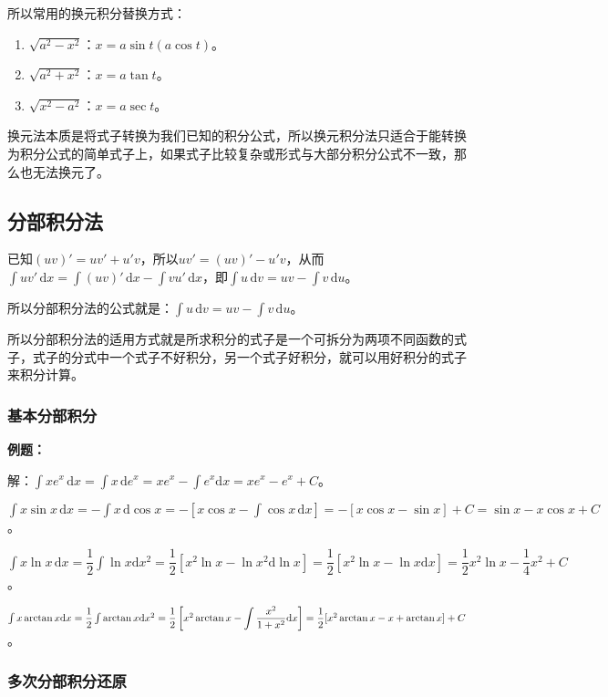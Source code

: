 \documentclass[UTF8, 12pt]{ctexart}
\begin{document}
所以常用的换元积分替换方式：

\begin{enumerate}
    \item $\sqrt{a^2-x^2}$：$x=a\sin t(a\cos t)$。
    \item $\sqrt{a^2+x^2}$：$x=a\tan t$。
    \item $\sqrt{x^2-a^2}$：$x=a\sec t$。
\end{enumerate}

换元法本质是将式子转换为我们已知的积分公式，所以换元积分法只适合于能转换为积分公式的简单式子上，如果式子比较复杂或形式与大部分积分公式不一致，那么也无法换元了。

\subsection{分部积分法}

已知$(uv)'=uv'+u'v$，所以$uv'=(uv)'-u'v$，从而$\int uv'\,\textrm{d}x=\int(uv)'\,\textrm{d}x-\int vu'\,\textrm{d}x$，即$\int u\,\textrm{d}v=uv-\int v\,\textrm{d}u$。

所以分部积分法的公式就是：$\int u\,\textrm{d}v=uv-\int v\,\textrm{d}u$。

所以分部积分法的适用方式就是所求积分的式子是一个可拆分为两项不同函数的式子，式子的分式中一个式子不好积分，另一个式子好积分，就可以用好积分的式子来积分计算。

\subsubsection{基本分部积分}

\textbf{例题：}

解：$\int xe^x\,\textrm{d}x=\int x\,\textrm{d}e^x=xe^x-\int e^x\textrm{d}x=xe^x-e^x+C$。

$\int x\sin x\,\textrm{d}x=-\int x\,\textrm{d}\cos x=-[x\cos x-\int\cos x\,\textrm{d}x]=-[x\cos x-\sin x]+C=\sin x-x\cos x+C$。

$\int x\ln x\,\textrm{d}x=\dfrac{1}{2}\int\ln x\textrm{d}x^2=\dfrac{1}{2}[x^2\ln x-\ln x^2\textrm{d}\ln x]=\dfrac{1}{2}[x^2\ln x-\ln x\textrm{d}x]=\dfrac{1}{2}x^2\ln x-\dfrac{1}{4}x^2+C$。

$\int x\arctan x\textrm{d}x=\dfrac{1}{2}\int\arctan x\textrm{d}x^2=\dfrac{1}{2}\left[x^2\arctan x-\displaystyle{\int\dfrac{x^2}{1+x^2}\textrm{d}x}\right]=\\ \dfrac{1}{2}[x^2\arctan x-x+\arctan x]+C$。

\subsubsection{多次分部积分还原}
\end{document}
